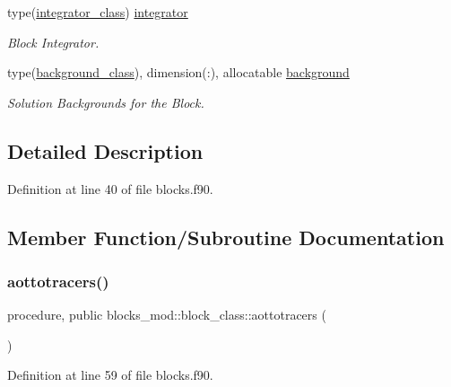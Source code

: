 \begin{DoxyCompactItemize}
type(\mbox{\hyperlink{structintegrator__mod_1_1integrator__class}{integrator\+\_\+class}}) \mbox{\hyperlink{structblocks__mod_1_1block__class_ae98f0c5caf5f37db1c7f5bb8aace1c26}{integrator}}
\begin{DoxyCompactList}\small\item\em Block Integrator. \end{DoxyCompactList}\item 
type(\mbox{\hyperlink{structbackground__mod_1_1background__class}{background\+\_\+class}}), dimension(\+:), allocatable \mbox{\hyperlink{structblocks__mod_1_1block__class_a774c07bf82d1392236abc81c285ea943}{background}}
\begin{DoxyCompactList}\small\item\em Solution Backgrounds for the Block. \end{DoxyCompactList}\end{DoxyCompactItemize}


\subsection{Detailed Description}


Definition at line 40 of file blocks.\+f90.



\subsection{Member Function/\+Subroutine Documentation}
\mbox{\label{structblocks__mod_1_1block__class_af7ee4536d72f1a114d9289c9e484f703}} 
\subsubsection{\texorpdfstring{aottotracers()}{aottotracers()}}
{\footnotesize\ttfamily procedure, public blocks\+\_\+mod\+::block\+\_\+class\+::aottotracers (\begin{DoxyParamCaption}{ }\end{DoxyParamCaption})}



Definition at line 59 of file blocks.\+f90.

\mbox{\label{structblocks__mod_1_1block__class_ad1d0f1aca1323fad86177deb0b818a51}} 
